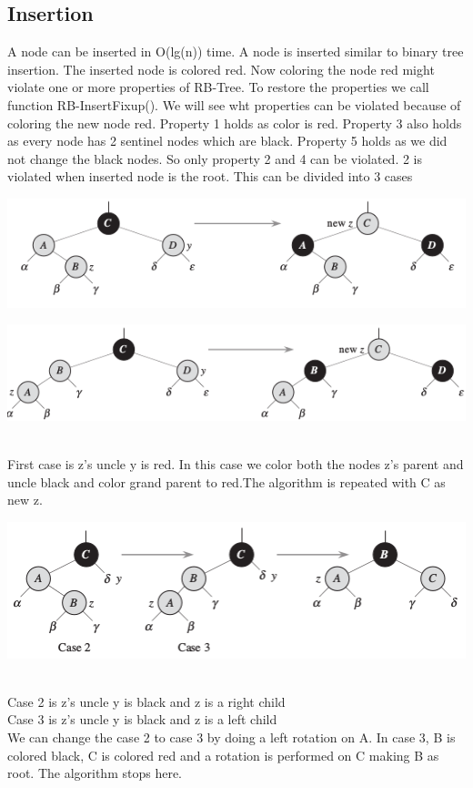 \documentclass[BTech]{iitmdiss}
\begin{document}
\subsection{Insertion}
A node can be inserted in O(lg(n)) time. A node is inserted similar to binary tree insertion. The inserted node is colored red. Now coloring the node red might violate one or more properties of RB-Tree. To restore the properties we call function RB-InsertFixup(). We will see wht properties can be violated because of coloring the new node red. Property 1 holds as color is red. Property 3 also holds as every node has 2 sentinel nodes which are black. Property 5 holds as we did not change the black nodes. So only property 2 and 4 can be violated. 2 is violated when inserted node is the root. This can be divided into 3 cases\\
\centerline{\includegraphics{cse1.png}}
\centerline{\includegraphics{case1.png}}\\
First case is z's uncle y is red. In this case we color both the nodes z's parent and uncle black and color grand parent to red.The algorithm is repeated with C as new z.\\
\centerline{\includegraphics{case2,3.png}}\\
Case 2 is z's uncle y is black and z is a right child\\
Case 3 is z's uncle y is black and z is a left child\\
We can change the case 2 to case 3 by doing a left rotation on A. In case 3, B is colored black, C is colored red and a rotation is performed on C making B as root. The algorithm stops here.
\end{document}
